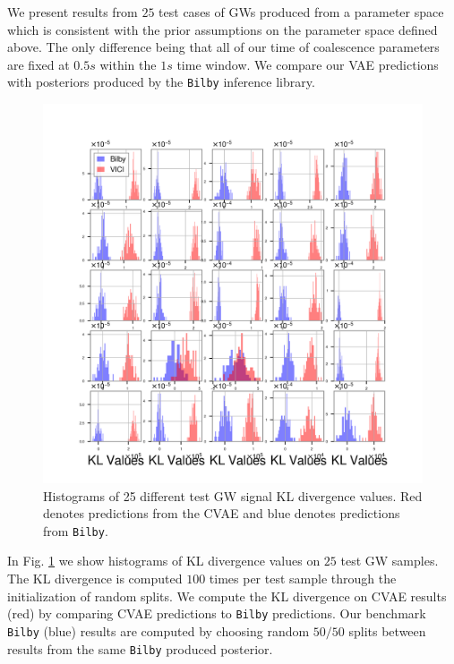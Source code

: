 \documentclass[%
showpacs,
 amsmath,amssymb,
 aps,
 twocolumn,
 prl,
 reprint,
floatfix,
]{revtex4-1}
\begin{document}
%
%
We present results from $25$ test cases of GWs produced from 
a parameter space which is consistent with the prior assumptions  
on the parameter space defined above. The only difference 
being that all of our time of coalescence parameters are fixed 
at $0.5s$ within the $1s$ time window. We compare our 
VAE predictions with posteriors produced by the \texttt{Bilby}
inference library.

%
%
\begin{figure}
    \includegraphics[width=\columnwidth]{images/hist-kl_0.png}
    \caption{\label{fig:kl_results} Histograms of 
    25 different test GW signal KL divergence values. 
    Red denotes predictions from the CVAE and blue 
    denotes predictions from \texttt{Bilby}.}
\end{figure}

In Fig. \ref{fig:kl_results} we show histograms of KL divergence 
values on $25$ test GW samples. The KL divergence is computed 
$100$ times per test sample through the initialization of random splits. We compute 
the KL divergence on CVAE results (red) by comparing CVAE predictions 
to \texttt{Bilby} predictions. Our benchmark \texttt{Bilby} (blue) results are computed by choosing 
random $50/50$ splits between results from the same \texttt{Bilby} produced 
posterior. 
\end{document}
